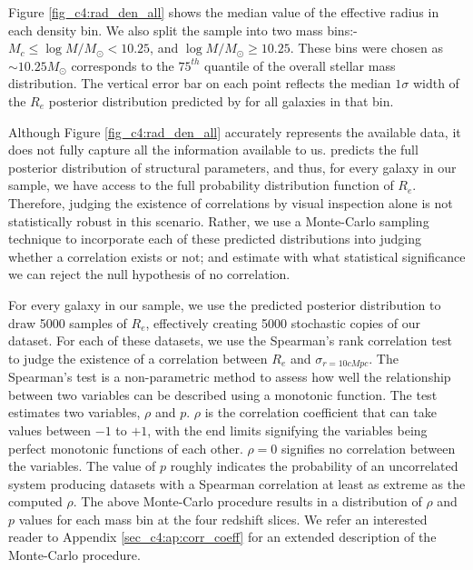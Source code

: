\begin{table}
\begin{tabular}{c|c|M{2.4cm}M{2.4cm}M{2.4cm}M{2.4cm}}
    \end{tabular}
\end{table}

Figure \ref{fig_c4:rad_den_all} shows the median value of the effective radius in each density bin. We also split the sample into two mass bins:-  $M_c \leq \log M/M_{\odot} < 10.25$, and $\log M/M_{\odot} \geq 10.25$. These bins were chosen as $\sim10.25M_{\odot}$ corresponds to the $75^{th}$ quantile of the overall stellar mass distribution. The vertical error bar on each point reflects the median $1\sigma$ width of the $R_e$ posterior distribution predicted by \gampen{} for all galaxies in that bin. 

Although Figure \ref{fig_c4:rad_den_all} accurately represents the available data, it does not fully capture all the information available to us. \gampen{} predicts the full posterior distribution of structural parameters, and thus, for every galaxy in our sample, we have access to the full probability distribution function of $R_e$. Therefore, judging the existence of correlations by visual inspection alone is not statistically robust in this scenario. Rather, we use a Monte-Carlo sampling technique to incorporate each of these predicted distributions into judging whether a correlation exists or not; and estimate with what statistical significance we can reject the null hypothesis of no correlation. 

For every galaxy in our sample, we use the predicted posterior distribution to draw 5000 samples of $R_e$, effectively creating 5000 stochastic copies of our dataset. For each of these datasets, we use the Spearman's rank correlation test \citep{spearman_original} to judge the existence of a correlation between $R_e$ and $\sigma_{r=10cMpc}$. The Spearman's test is a non-parametric method to assess how well the relationship between two variables can be described using a monotonic function. The test estimates two variables, $\rho$ and $p$. $\rho$ is the correlation coefficient that can take values between $-1$ to $+1$, with the end limits signifying the variables being perfect monotonic functions of each other. $\rho=0$ signifies no correlation between the variables. The value of $p$ roughly indicates the probability of an uncorrelated system producing datasets with a Spearman correlation at least as extreme as the computed $\rho$. The above Monte-Carlo procedure results in a distribution of $\rho$ and $p$ values for each mass bin at the four redshift slices. We refer an interested reader to Appendix \ref{sec_c4:ap:corr_coeff} for an extended description of the Monte-Carlo procedure. 

